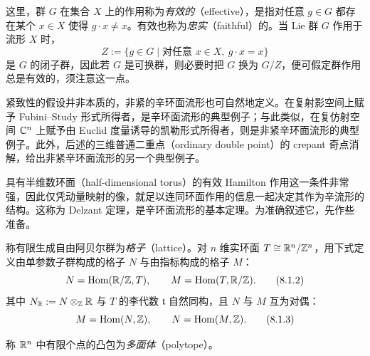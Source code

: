 这里，群 $G$ 在集合 $X$ 上的作用称为\emph{有效的}（effective），是指对任意 $g\in G$ 都存在某个 $x\in X$ 使得 $g\cdot x\neq x$。有效也称为\emph{忠实}（faithful）的。当 Lie 群 $G$ 作用于流形 $X$ 时，
\begin{equation}
  Z:=\{g\in G\mid \text{对任意 }x\in X,\ g\cdot x=x\} \tag{8.1.1}
\end{equation}
是 $G$ 的闭子群，因此若 $G$ 是可换群，则必要时把 $G$ 换为 $G/Z$，便可假定群作用总是有效的，须注意这一点。

紧致性的假设并非本质的，非紧的辛环面流形也可自然地定义。在复射影空间上赋予 Fubini--Study 形式所得者，是辛环面流形的典型例子；与此类似，在复仿射空间 $\mathbb{C}^n$ 上赋予由 Euclid 度量诱导的凯勒形式所得者，则是非紧辛环面流形的典型例子。此外，后述的三维普通二重点（ordinary double point）的 crepant 奇点消解，给出非紧辛环面流形的另一个典型例子。


具有半维数环面（half-dimensional torus）的有效 Hamilton 作用这一条件非常强，因此仅凭动量映射的像，就足以连同环面作用的信息一起决定其作为辛流形的结构。这称为 Delzant 定理，是辛环面流形的基本定理。为准确叙述它，先作些准备。

称有限生成自由阿贝尔群为\emph{格子}（lattice）。对 $n$ 维实环面 $T\cong\mathbb{R}^n/\mathbb{Z}^n$，用下式定义由单参数子群构成的格子 $N$ 与由指标构成的格子 $M$：
\begin{equation}
  N=\operatorname{Hom}(\mathbb{R}/\mathbb{Z},T),\qquad M=\operatorname{Hom}(T,\mathbb{R}/\mathbb{Z}). \tag{8.1.2}
\end{equation}
其中 $N_{\mathbb{R}}:=N\otimes_{\mathbb{Z}}\mathbb{R}$ 与 $T$ 的李代数 $\mathfrak{t}$ 自然同构，且 $N$ 与 $M$ 互为对偶：
\begin{equation}
  M=\operatorname{Hom}(N,\mathbb{Z}),\qquad N=\operatorname{Hom}(M,\mathbb{Z}). \tag{8.1.3}
\end{equation}

称 $\mathbb{R}^n$ 中有限个点的凸包为\emph{多面体}（polytope）。

